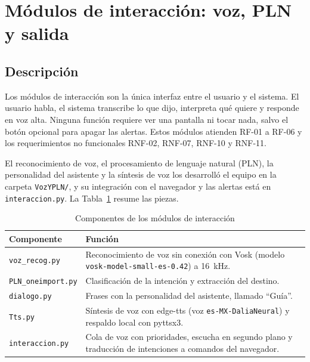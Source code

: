 \section{Módulos de interacción: voz, PLN y salida}
\label{sec:dev_interaccion}

\subsection{Descripción}

Los módulos de interacción son la única interfaz entre el usuario y el sistema. El
usuario habla, el sistema transcribe lo que dijo, interpreta qué quiere y responde en
voz alta. Ninguna función requiere ver una pantalla ni tocar nada, salvo el botón
opcional para apagar las alertas. Estos módulos atienden RF-01 a RF-06 y los
requerimientos no funcionales RNF-02, RNF-07, RNF-10 y RNF-11.

El reconocimiento de voz, el procesamiento de lenguaje natural (PLN), la personalidad
del asistente y la síntesis de voz los desarrolló el equipo en la carpeta
\texttt{VozYPLN/}, y su integración con el navegador y las alertas está en
\texttt{interaccion.py}. La Tabla~\ref{tab:inter_partes} resume las piezas.

\begin{table}[H]
\centering
\caption{Componentes de los módulos de interacción}
\label{tab:inter_partes}
\renewcommand{\arraystretch}{1.25}
\begin{tabular}{|p{3.6cm}|p{10.9cm}|}
\hline
\textbf{Componente} & \textbf{Función} \\
\hline
\texttt{voz\_recog.py} & Reconocimiento de voz sin conexión con Vosk (modelo
\texttt{vosk-model-small-es-0.42}) a 16~kHz. \\
\hline
\texttt{PLN\_oneimport.py} & Clasificación de la intención y extracción del destino. \\
\hline
\texttt{dialogo.py} & Frases con la personalidad del asistente, llamado ``Guía''. \\
\hline
\texttt{Tts.py} & Síntesis de voz con edge-tts (voz \texttt{es-MX-DaliaNeural}) y
respaldo local con pyttsx3. \\
\hline
\texttt{interaccion.py} & Cola de voz con prioridades, escucha en segundo plano y
traducción de intenciones a comandos del navegador. \\
\hline
\end{tabular}
\end{table}

